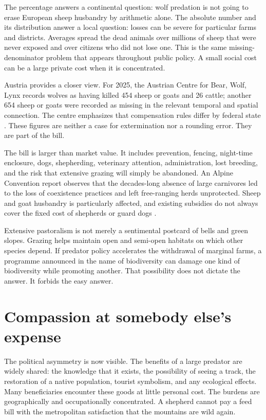 ﻿\documentclass[12pt,a4paper]{book}
\begin{document}
The percentage answers a continental question: wolf predation is not going to
erase European sheep husbandry by arithmetic alone.  The absolute number and
its distribution answer a local question: losses can be severe for particular
farms and districts.  Averages spread the dead animals over millions of sheep
that were never exposed and over citizens who did not lose one.  This is the
same missing-denominator problem that appears throughout public policy.  A
small social cost can be a large private cost when it is concentrated.

Austria provides a closer view.  For 2025, the Austrian Centre for Bear, Wolf,
Lynx records wolves as having killed 454 sheep or goats and 26 cattle; another
654 sheep or goats were recorded as missing in the relevant temporal and
spatial connection.  The centre emphasizes that compensation rules differ by
federal state \cite{AustrianCarnivoreLosses2025}.  These figures are neither a
case for extermination nor a rounding error.  They are part of the bill.

The bill is larger than market value.  It includes prevention, fencing,
night-time enclosure, dogs, shepherding, veterinary attention, administration,
lost breeding, and the risk that extensive grazing will simply be abandoned.
An Alpine Convention report observes that the decades-long absence of large
carnivores led to the loss of coexistence practices and left free-ranging
herds unprotected.  Sheep and goat husbandry is particularly affected, and
existing subsidies do not always cover the fixed cost of shepherds or guard
dogs \cite{AlpineConventionCarnivorePrevention2024}.

Extensive pastoralism is not merely a sentimental postcard of bells and green
slopes.  Grazing helps maintain open and semi-open habitats on which other
species depend.  If predator policy accelerates the withdrawal of marginal
farms, a programme announced in the name of biodiversity can damage one kind
of biodiversity while promoting another.  That possibility does not dictate
the answer.  It forbids the easy answer.

\section{Compassion at somebody else's expense}

The political asymmetry is now visible.  The benefits of a large predator are
widely shared: the knowledge that it exists, the possibility of seeing a
track, the restoration of a native population, tourist symbolism, and any
ecological effects.  Many beneficiaries encounter these goods at little
personal cost.  The burdens are geographically and occupationally
concentrated.  A shepherd cannot pay a feed bill with the metropolitan
satisfaction that the mountains are wild again.
\end{document}
